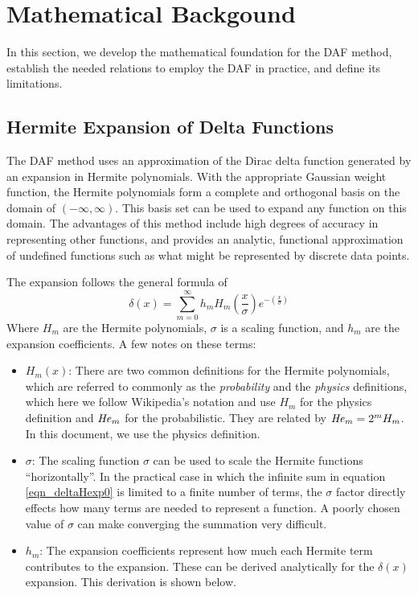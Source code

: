 \documentclass[preprint]{revtex4}
\begin{document}

\section{Mathematical Backgound}
In this section, we develop the mathematical foundation for the DAF method, establish 
the needed relations to employ the DAF in practice, and define its limitations. 

\subsection{Hermite Expansion of Delta Functions}
The DAF method uses an approximation of the Dirac delta function generated by 
an expansion in Hermite polynomials. With the appropriate Gaussian weight function, 
the Hermite polynomials form a complete and orthogonal basis on the domain of 
$(-\infty,\infty)$. 
This basis set can be used to expand any function on this domain. The advantages
of this method include high degrees of accuracy in representing other functions, 
and provides an analytic, functional approximation of undefined functions such as 
what might be represented by discrete data points. 

The expansion follows the general formula\cite{HermiteWiki} of 
\begin{equation}
\label{eqn_deltaHexp0}
\delta(x) = \sum_{m=0}^\infty h_m H_m\left(\frac{x}{\sigma}\right) e^{-\left(\frac{x}{\sigma}\right)}
\end{equation}
Where $H_m$ are the Hermite polynomials, $\sigma$ is a scaling function, and $h_m$ are the
expansion coefficients. A few notes on these terms: 
\begin{itemize}
\item{$H_m(x)$}: There are two common definitions for the Hermite polynomials, which are referred
to commonly as the {\it probability} and the {\it physics} definitions, which here we follow
Wikipedia's notation and use $H_m$ for the physics definition and ${\it He}_m$ for the probabilistic. 
They are related by ${\it He}_m = 2^m H_m$. In this document, we use the physics definition. 
\item{$\sigma$}: The scaling function $\sigma$ can be used to scale the Hermite functions 
``horizontally''. In the practical case in which the infinite sum in equation \ref{eqn_deltaHexp0}
is limited to a finite number of terms, the $\sigma$ factor directly effects how many terms
are needed to represent a function. 
A poorly chosen value of $\sigma$ can make converging the summation very difficult. 

\item{$h_m$}: The expansion coefficients represent how much each Hermite term contributes to the
expansion. These can be derived analytically for the $\delta(x)$ expansion.
This derivation is shown below. 
\end{itemize}
\end{document}
